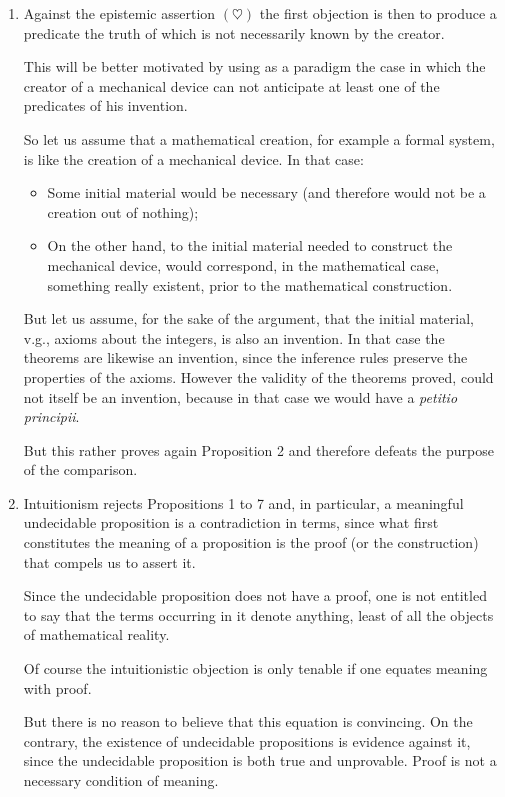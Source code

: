 \documentclass[12pt]{article}
\begin{document}
\begin{enumerate}
\item Against the epistemic assertion $(\heartsuit)$ the first objection is then to produce a predicate the truth of which is not necessarily known by the creator.

This will be better motivated by using as a paradigm the case in which the creator of a mechanical device can not anticipate at least one of the predicates of his invention.

So let us assume that a mathematical creation, for example a formal system, is like the creation of a mechanical device. In that case: 

\begin{itemize}
\item Some initial material would be necessary (and therefore would not be a creation out of nothing);

\item On the other hand, to the initial material needed to construct the mechanical device, would correspond, in the mathematical case, something really existent, prior to the mathematical construction.
\end{itemize}

But let us assume, for the sake of the argument, that the initial material, v.g., axioms about the integers, is also an invention. In that case the theorems are likewise an invention, since the inference rules preserve the properties of the axioms. However the validity of the theorems proved, could not itself be an invention, because in that case we would have a \emph{petitio principii}.

But this rather proves again Proposition 2 and therefore defeats the purpose of the comparison.

\item Intuitionism rejects Propositions 1 to 7 and, in particular, a meaningful undecidable proposition is a contradiction in terms, since what first constitutes the meaning of a proposition is the proof (or the construction) that compels us to assert it.

Since the undecidable proposition does not have a proof, one is not entitled to say that the terms occurring in it  denote anything, least of all the objects of mathematical reality.

Of course the intuitionistic objection is only tenable if one equates meaning with proof.

But there is no reason to believe that this equation is convincing. On the contrary, the existence of undecidable propositions is evidence against it, since the undecidable proposition is both true and unprovable. Proof is not a necessary condition of meaning. 
\end{enumerate}
\end{document}
